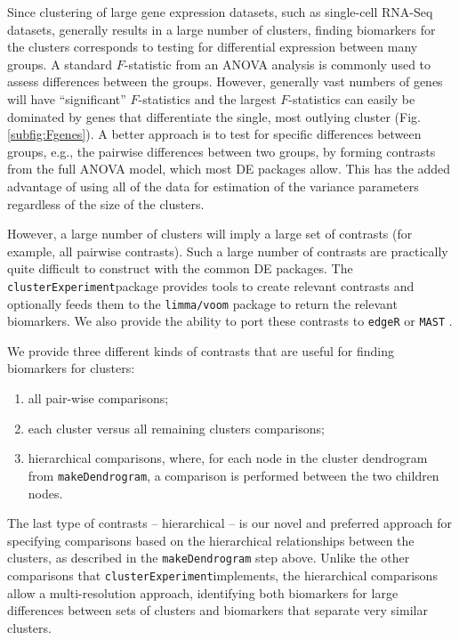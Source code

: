 \documentclass[10pt,letterpaper]{article}
\newcommand{\f}[1]{\texttt{#1}}
\newcommand{\CE}{\f{clusterExperiment}}
\begin{document}
Since clustering of large gene expression datasets, such as single-cell RNA-Seq datasets, generally results in a large number of clusters, finding biomarkers for the clusters corresponds to testing for differential expression between many groups. A standard $F$-statistic from an ANOVA analysis is commonly used to assess differences between the groups. However, generally vast numbers of genes will have ``significant'' $F$-statistics and the largest $F$-statistics can easily be dominated by genes that differentiate the single, most outlying cluster (Fig. \ref{subfig:Fgenes}). A better approach is to test for specific differences between groups, e.g., the pairwise differences between two groups, by forming contrasts from the full ANOVA model, which most DE packages allow. This has the added advantage of using all of the data for estimation of the variance parameters regardless of the size of the clusters.
 
However, a large number of clusters will imply a large set of contrasts (for example, all pairwise contrasts). Such a large number of contrasts are practically quite difficult to construct with the common DE packages. The \CE package provides tools to create relevant contrasts and optionally feeds them to the \texttt{limma/voom} \cite{Smyth:2005fk,Law:2014ff}
package to return the relevant biomarkers. We also provide the ability to port these contrasts to \texttt{edgeR} \cite{Robinson:2010cw} or \texttt{MAST} \cite{Finak:2015id}.

We provide three different kinds of contrasts that are useful for finding biomarkers for clusters: \begin{enumerate}
\item all pair-wise comparisons;
\item each cluster versus all remaining clusters comparisons;
\item hierarchical comparisons, where, for each node in the cluster dendrogram from \f{makeDendrogram}, a comparison is performed between the two children nodes.
\end{enumerate}
The last type of contrasts -- hierarchical -- is our novel and preferred approach for specifying comparisons based on the hierarchical relationships between the clusters, as described in the \f{makeDendrogram} step above. Unlike the other comparisons that \CE implements, the hierarchical comparisons allow a multi-resolution approach, identifying both biomarkers for large differences between sets of clusters and biomarkers that separate very similar clusters.
\end{document}
